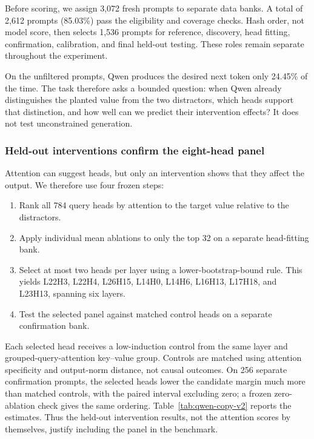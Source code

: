 Before scoring, we assign 3,072 fresh prompts to separate data banks. A total
of 2,612 prompts (85.03\%) pass the eligibility and coverage checks. Hash order,
not model score, then selects 1,536 prompts for reference, discovery, head
fitting, confirmation, calibration, and final held-out testing. These roles
remain separate throughout the experiment.

On the unfiltered prompts, Qwen produces the desired next token only 24.45\% of
the time. The task therefore asks a bounded question: when Qwen already
distinguishes the planted value from the two distractors, which heads support
that distinction, and how well can we predict their intervention effects? It
does not test unconstrained generation.

\subsubsection{Held-out interventions confirm the eight-head panel}

Attention can suggest heads, but only an intervention shows that they affect
the output. We therefore use four frozen steps:

\begin{enumerate}
  \item Rank all 784 query heads by attention to the target value relative to
  the distractors.
  \item Apply individual mean ablations to only the top 32 on a separate
  head-fitting bank.
  \item Select at most two heads per layer using a lower-bootstrap-bound rule.
  This yields L22H3, L22H4, L26H15, L14H0, L14H6, L16H13, L17H18, and L23H13,
  spanning six layers.
  \item Test the selected panel against matched control heads on a separate
  confirmation bank.
\end{enumerate}

Each selected head receives a low-induction control from the same layer and
grouped-query-attention key--value group. Controls are matched using attention
specificity and output-norm distance, not causal outcomes. On 256 separate
confirmation prompts, the selected heads lower the candidate margin much more
than matched controls, with the paired interval excluding zero; a frozen
zero-ablation check gives the same ordering. Table~\ref{tab:qwen-copy-v2}
reports the estimates. Thus the held-out intervention results, not the attention
scores by themselves, justify including the panel in the benchmark.

